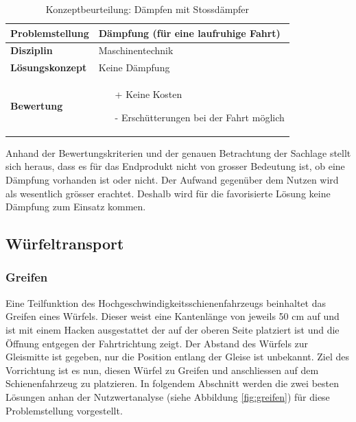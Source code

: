 \documentclass[../../main.tex]{subfiles}
\begin{document}
\begin{flushleft}
    \begin{table}[h]
    \begin{tabular}{ | l | p{11cm} |}
    \hline
    \textbf{Problemstellung} & Dämpfung (für eine laufruhige Fahrt) \\ \hline
    \textbf{Disziplin} & Maschinentechnik \\ \hline
    \textbf{Lösungskonzept} & Keine Dämpfung \\ \hline
    \textbf{Bewertung} &  \begin{itemize}
                            \item[+] Keine Kosten
                            \item[-] Erschütterungen bei der Fahrt möglich
                          \end{itemize} \\ \hline
    \end{tabular}
    \caption{Konzeptbeurteilung: Dämpfen mit Stossdämpfer}
    \label{tab:konzept_fahrwerk_keinedaempfung}
\end{table}
\end{flushleft}

Anhand der Bewertungskriterien und der genauen Betrachtung der Sachlage stellt sich heraus, dass es für das Endprodukt nicht von grosser Bedeutung ist, ob eine Dämpfung vorhanden ist oder nicht. Der Aufwand gegenüber dem Nutzen wird als wesentlich grösser erachtet. Deshalb wird für die favorisierte Lösung keine Dämpfung zum Einsatz kommen.

\subsection{Würfeltransport}

\subsubsection{Greifen}
 Eine Teilfunktion des Hochgeschwindigkeitsschienenfahrzeugs beinhaltet das Greifen eines Würfels. Dieser weist eine Kantenlänge von jeweils 50 cm auf und ist mit einem Hacken ausgestattet der auf der oberen Seite platziert ist und die Öffnung entgegen der Fahrtrichtung zeigt. Der Abstand des Würfels zur Gleismitte ist gegeben, nur die Position entlang der Gleise ist unbekannt. Ziel des Vorrichtung ist es nun, diesen Würfel zu Greifen und anschliessen auf dem Schienenfahrzeug zu platzieren. In folgendem Abschnitt werden die zwei besten Lösungen anhan der Nutzwertanalyse (siehe Abbildung \ref{fig:greifen}) für diese Problemstellung vorgestellt.
\end{document}
